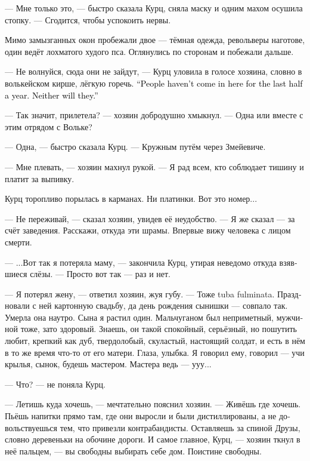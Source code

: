 \documentclass[a4paper,12pt,fleqn]{book}\usepackage{cooltooltips}\usepackage{polyglossia}\setdefaultlanguage[babelshorthands=true]{russian}\setotherlanguage{english}\defaultfontfeatures{Ligatures=TeX,Mapping=tex-text} \usepackage{xcolor}\definecolor{lightgray}{HTML}{bbbbbb}\color{lightgray}\newcommand{\ml}[3]{\textenglish{\textcolor{black}{#3}}}
\newcommand{\asterism}{\vspace{1em}{\centering\Large\bfseries$\ast~\ast~\ast$\par}\vspace{1em}}
\begin{document}
--- Мне только это, --- быстро сказала Курц, сняла маску и одним махом осушила стопку.
--- Сгодится, чтобы успокоить нервы.

Мимо замызганных окон пробежали двое --- тёмная одежда, револьверы наготове, один ведёт лохматого худого пса.
Оглянулись по сторонам и побежали дальше.

--- Не волнуйся, сюда они не зайдут, --- Курц уловила в голосе хозяина, словно в волькейском кирше, лёгкую горечь.
\ml{$0$}
{--- Никто сюда не заходит последние полгода.}
{``People haven't come in here for the last half a year.}
\ml{$0$}
{Не зайдут и они.}
{Neither will they.''}

\asterism

--- Так значит, прилетела? --- хозяин добродушно хмыкнул.
--- Одна или вместе с этим отрядом с Вольке?

--- Одна, --- быстро сказала Курц.
--- Кружным путём через Змейевиче.

--- Мне плевать, --- хозяин махнул рукой.
--- Я рад всем, кто соблюдает тишину и платит за выпивку.

Курц торопливо порылась в карманах.
Ни платинки.
Вот это номер...

--- Не переживай, --- сказал хозяин, увидев её неудобство.
--- Я же сказал --- за счёт заведения.
Расскажи, откуда эти шрамы.
Впервые вижу человека с лицом смерти.

--- ...Вот так я потеряла маму, --- закончила Курц, утирая неведомо откуда взявшиеся слёзы.
--- Просто вот так --- раз и нет.

--- Я потерял жену, --- ответил хозяин, жуя губу.
--- Тоже tuba fulminata.
Праздновали с ней картонную свадьбу, да день рождения сынишки --- совпало так.
Умерла она наутро.
Сына я растил один.
Мальчуганом был неприметный, мужчиной тоже, зато здоровый.
Знаешь, он такой спокойный, серьёзный, но пошутить любит, крепкий как дуб, твердолобый, скуластый, настоящий солдат, и есть в нём в то же время что-то от его матери.
Глаза, улыбка.
Я говорил ему, говорил --- учи крылья, сынок, будешь мастером.
Мастера ведь --- ууу...

--- Что? --- не поняла Курц.

--- Летишь куда хочешь, --- мечтательно пояснил хозяин.
--- Живёшь где хочешь.
Пьёшь напитки прямо там, где они выросли и были дистиллированы, а не довольствуешься тем, что привезли контрабандисты.
Оставляешь за спиной Друзы, словно деревеньки на обочине дороги.
И самое главное, Курц, --- хозяин ткнул в неё пальцем, --- вы свободны выбирать себе дом.
Поистине свободны.
\end{document}
